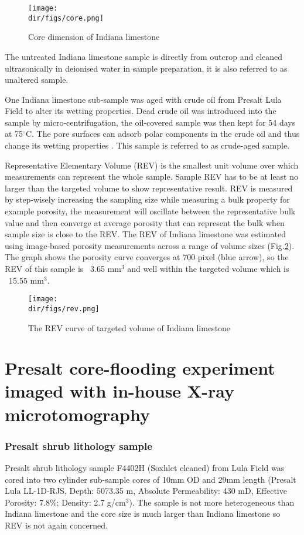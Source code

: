 \begin{figure}[htbp]
  \centering
  \texttt{[image: \\dir/figs/core.png]}
  \caption{Core dimension of Indiana limestone} 
  \label{core} 
\end{figure}

The untreated Indiana limestone sample is directly from outcrop and cleaned ultrasonically in deionised water in sample preparation, it is also referred to as unaltered sample.

One Indiana limestone sub-sample was aged with crude oil from Presalt Lula Field to alter its wetting properties. Dead crude oil was introduced into the sample by micro-centrifugation, the oil-covered sample was then kept for 54 days at 75$^{\circ}$C. The pore surfaces can adsorb polar components in the crude oil and thus change its wetting properties \citep{buckley1998mechanisms}. This sample is referred to as crude-aged sample. 

Representative Elementary Volume (REV) is the smallest unit volume over which measurements can represent the whole sample. Sample REV has to be at least no larger than the targeted volume to show representative result. REV is measured by step-wisely increasing the sampling size while measuring a bulk property for example porosity, the measurement will oscillate between the representative bulk value and then converge at average porosity that can represent the bulk when sample size is close to the REV. The REV of Indiana limestone was estimated using image-based porosity measurements across a range of volume sizes (Fig.\ref{rev}). The graph shows the porosity curve converges at 700 pixel (blue arrow), so the REV of this sample is ~3.65 mm$^3$ and well within the targeted volume which is ~15.55 mm$^3$.

\begin{figure}[htbp]
  \centering
  \texttt{[image: \\dir/figs/rev.png]}
  \caption{The REV curve of targeted volume of Indiana limestone}
  \label{rev}
\end{figure}

\section{Presalt core-flooding experiment imaged with in-house X-ray microtomography}

\subsubsection{Presalt shrub lithology sample}
Presalt shrub lithology sample F4402H (Soxhlet cleaned) from Lula Field was cored into two cylinder sub-sample cores of 10mm OD and 29mm length (Presalt Lula LL-1D-RJS, Depth: 5073.35 m, Absolute Permeability: 430 mD, Effective Porosity: 7.8\%; Density: 2.7 g/cm$^3$). The sample is not more heterogeneous than Indiana limestone and the core size is much larger than Indiana limestone so REV is not again concerned.

